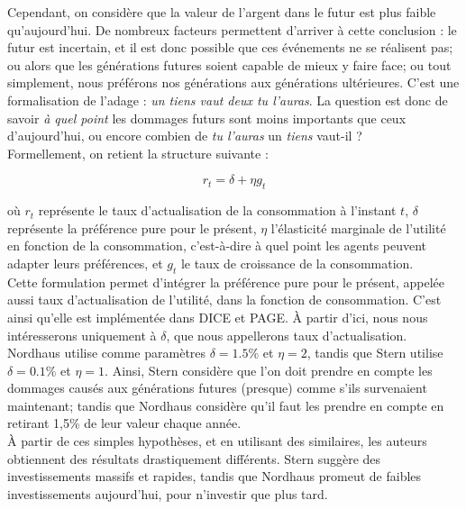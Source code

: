 Cependant, on considère que la valeur de l'argent dans le futur est plus faible qu'aujourd'hui. De nombreux facteurs permettent d'arriver à cette conclusion : le futur est incertain, et il est donc possible que ces événements ne se réalisent pas; ou alors que les générations futures soient capable de mieux y faire face; ou tout simplement, nous préférons nos générations aux générations ultérieures. C'est une formalisation de l'adage : \emph{un tiens vaut deux tu l'auras}. La question est donc de savoir \emph{à quel point} les dommages futurs sont moins importants que ceux d'aujourd'hui, ou encore combien de \emph{tu l'auras} un \emph{tiens} vaut-il ? \\

Formellement, on retient la structure suivante : 

\begin{equation}
    r_t = \delta + \eta g_t 
    \label{eq:disc_rate}
\end{equation}

où $r_t$ représente le taux d'actualisation de la consommation à l'instant $t$, $\delta$ représente la préférence pure pour le présent, $\eta$ l'élasticité marginale de l'utilité en fonction de la consommation, c'est-à-dire à quel point les agents peuvent adapter leurs préférences,  et $g_t$ le taux de croissance de la consommation. \\

Cette formulation permet d'intégrer la préférence pure pour le présent, appelée aussi taux d'actualisation de l'utilité, dans la fonction de consommation. C'est ainsi qu'elle est implémentée dans DICE et PAGE. À partir d'ici, nous nous intéresserons uniquement à $\delta$, que nous appellerons taux d'actualisation. \\

Nordhaus utilise comme paramètres $\delta = 1.5\%$ et $\eta=2$, tandis que Stern utilise $\delta=0.1\%$ et $\eta=1$. Ainsi, Stern considère que l'on doit prendre en compte les dommages causés aux générations futures (presque) comme s'ils survenaient maintenant; tandis que Nordhaus considère qu'il faut les prendre en compte en retirant 1,5\% de leur valeur chaque année. \\

À partir de ces simples hypothèses, et en utilisant des similaires, les auteurs obtiennent des résultats drastiquement différents. Stern suggère des investissements massifs et rapides, tandis que Nordhaus promeut de faibles investissements aujourd'hui, pour n'investir que plus tard. 


